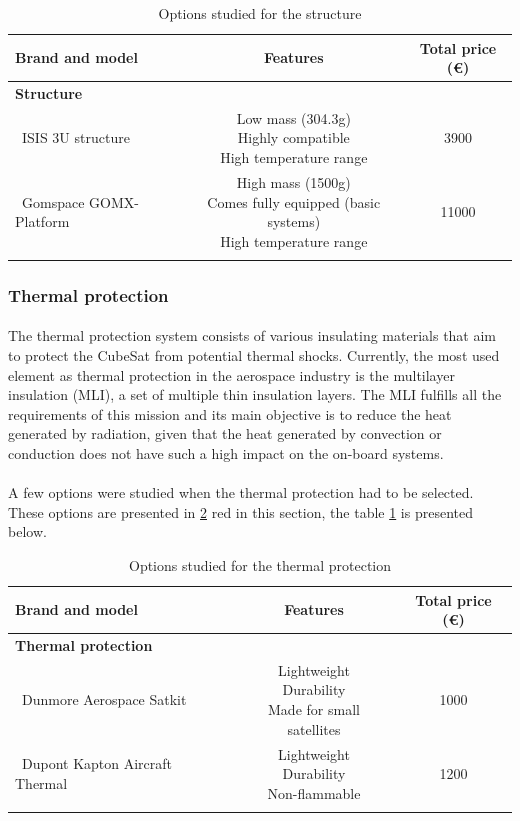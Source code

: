 \begin{longtable}{| l | c | c | }
\hline
\rowcolor[gray]{0.80}	\textbf{Brand and model} &  \textbf{Features}     & \textbf{Total price (\euro)}   \\
\hline
\endfirsthead

\rowcolor[gray]{0.85} \textbf{Structure} &  &  \\
	   ~ISIS 3U structure & \makecell{Low mass (304.3g) \\ Highly compatible \\ High temperature range} & 3900 \\
	   \hline
	   ~Gomspace GOMX-Platform & \makecell{High mass (1500g) \\ Comes fully equipped (basic systems) \\ High temperature range} & 11000 \\
	   \hline
\caption{Options studied for the structure}
\label{structureoptions}
\end{longtable}

\subsubsection{Thermal protection}
\paragraph{}The thermal protection system consists of various insulating materials that aim to protect the CubeSat from potential thermal shocks. Currently, the most used element as thermal protection in the aerospace industry is the multilayer insulation (MLI), a set of multiple thin insulation layers. The MLI fulfills all the requirements of this mission and its main objective is to reduce the heat generated by radiation, given that the heat generated by convection or conduction does not have such a high impact on the on-board systems.

\paragraph{}A few options were studied when the thermal protection had to be selected. These options are presented in \ref{thermaloptions}
red in this section, the table \ref{structureoptions} is presented below.

\begin{longtable}{| l | c | c | }
\hline
\rowcolor[gray]{0.80}	\textbf{Brand and model} &  \textbf{Features}     & \textbf{Total price (\euro)}   \\
\hline
\endfirsthead
\rowcolor[gray]{0.85} \textbf{Thermal protection} &  &  \\
	   ~Dunmore Aerospace Satkit & \makecell{Lightweight \\ Durability \\ Made for small satellites}& 1000 \\
	   \hline
	   ~Dupont Kapton Aircraft Thermal & \makecell{Lightweight \\ Durability \\ Non-flammable} & 1200 \\
	\hline

\caption{Options studied for the thermal protection}
\label{thermaloptions}
\end{longtable}
